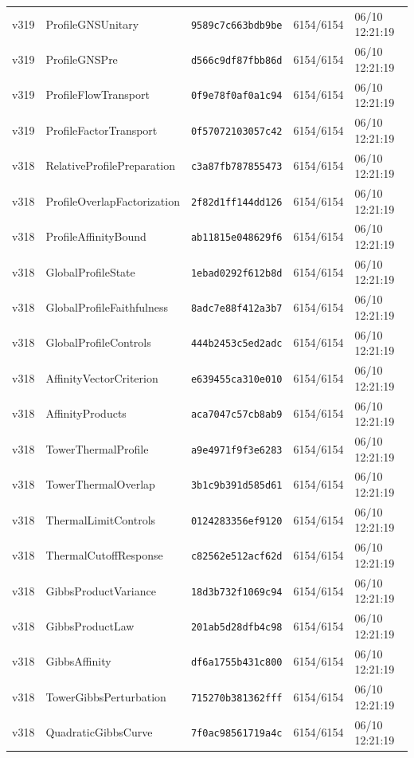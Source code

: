 \documentclass[11pt]{article}
\theoremstyle{definition}\newtheorem{deriv}{Derivation}
\begin{document}
{\begin{longtable}{@{}lllll@{}}
v319 & ProfileGNSUnitary & \texttt{9589c7c663bdb9be} & 6154/6154 & 06/10 12:21:19 \\
v319 & ProfileGNSPre & \texttt{d566c9df87fbb86d} & 6154/6154 & 06/10 12:21:19 \\
v319 & ProfileFlowTransport & \texttt{0f9e78f0af0a1c94} & 6154/6154 & 06/10 12:21:19 \\
v319 & ProfileFactorTransport & \texttt{0f57072103057c42} & 6154/6154 & 06/10 12:21:19 \\
v318 & RelativeProfilePreparation & \texttt{c3a87fb787855473} & 6154/6154 & 06/10 12:21:19 \\
v318 & ProfileOverlapFactorization & \texttt{2f82d1ff144dd126} & 6154/6154 & 06/10 12:21:19 \\
v318 & ProfileAffinityBound & \texttt{ab11815e048629f6} & 6154/6154 & 06/10 12:21:19 \\
v318 & GlobalProfileState & \texttt{1ebad0292f612b8d} & 6154/6154 & 06/10 12:21:19 \\
v318 & GlobalProfileFaithfulness & \texttt{8adc7e88f412a3b7} & 6154/6154 & 06/10 12:21:19 \\
v318 & GlobalProfileControls & \texttt{444b2453c5ed2adc} & 6154/6154 & 06/10 12:21:19 \\
v318 & AffinityVectorCriterion & \texttt{e639455ca310e010} & 6154/6154 & 06/10 12:21:19 \\
v318 & AffinityProducts & \texttt{aca7047c57cb8ab9} & 6154/6154 & 06/10 12:21:19 \\
v318 & TowerThermalProfile & \texttt{a9e4971f9f3e6283} & 6154/6154 & 06/10 12:21:19 \\
v318 & TowerThermalOverlap & \texttt{3b1c9b391d585d61} & 6154/6154 & 06/10 12:21:19 \\
v318 & ThermalLimitControls & \texttt{0124283356ef9120} & 6154/6154 & 06/10 12:21:19 \\
v318 & ThermalCutoffResponse & \texttt{c82562e512acf62d} & 6154/6154 & 06/10 12:21:19 \\
v318 & GibbsProductVariance & \texttt{18d3b732f1069c94} & 6154/6154 & 06/10 12:21:19 \\
v318 & GibbsProductLaw & \texttt{201ab5d28dfb4c98} & 6154/6154 & 06/10 12:21:19 \\
v318 & GibbsAffinity & \texttt{df6a1755b431c800} & 6154/6154 & 06/10 12:21:19 \\
v318 & TowerGibbsPerturbation & \texttt{715270b381362fff} & 6154/6154 & 06/10 12:21:19 \\
v318 & QuadraticGibbsCurve & \texttt{7f0ac98561719a4c} & 6154/6154 & 06/10 12:21:19 \\

\end{longtable}}
\end{document}

